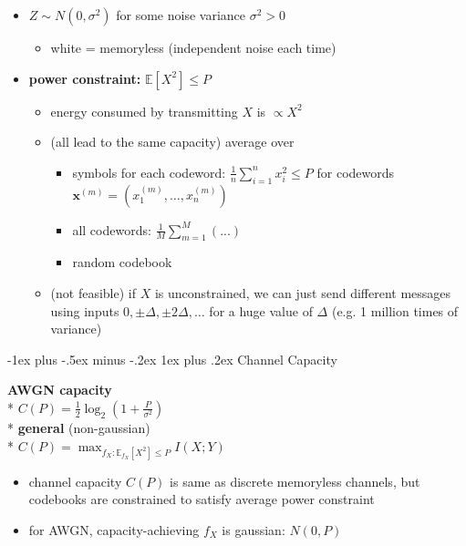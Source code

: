 \documentclass[10pt, landscape]{article}
\makeatletter
\renewcommand{\subsubsection}{\@startsection{subsubsection}{3}{0mm}%
  {-1ex plus -.5ex minus -.2ex}%
  {1ex plus .2ex}%
{\normalfont\small\bfseries}}%
\makeatother
\begin{document}
\begin{multicols*}{4}
  \begin{itemize}
    \item {} $Z \sim N(0, \sigma^2)$ for some noise variance $\sigma^2 > 0$
      \begin{itemize}
        \item white = memoryless (independent noise each time)
      \end{itemize}
    \item \textbf{power constraint:} $\mathbb{E}[X^2] \leq P$
      \begin{itemize}
        \item energy consumed by transmitting $X$ is $\propto X^2$
        \item (all lead to the same capacity) average over
          \begin{itemize}
            \item symbols for each codeword: $\frac{1}{n}\sum^n_{i=1}x^2_i \leq P$ for codewords $\mathbf{x}^{(m)} = ( x_1^{(m)}, \dots, x_n^{(m)} )$
            \item all codewords: $\frac{1}{M}\sum^M_{m=1}(...)$
            \item random codebook
          \end{itemize}
        \item (not feasible) if $X$ is unconstrained, we can just send different messages using inputs $0, \pm \Delta, \pm 2\Delta, \dots$ for a huge value of  $\Delta$ (e.g. 1 million times of variance)
      \end{itemize}
  \end{itemize}

  \subsubsection{Channel Capacity}

  \begin{tightcenter}
    \textbf{AWGN capacity} \\*
    $C(P) = \frac{1}{2} \log_2 (1 + \frac{P}{\sigma^2})$ \\*
    \textbf{general} (non-gaussian) \\*
    \( {\displaystyle{ C(P) = \max_{f_X : \mathbb{E}_{f_X} [X^2] \leq P} I(X;Y) }} \) 
  \end{tightcenter}

  \begin{itemize}
    \item channel capacity $C(P)$ is same as discrete memoryless channels, but codebooks are constrained to satisfy average power constraint
    \item for AWGN, capacity-achieving $f_X$ is gaussian: $N(0,P)$
  \end{itemize}


\end{multicols*}
\end{document}
